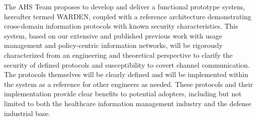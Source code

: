 \documentclass{sbir}
\begin{document}
 
 
\pagestyle{proprietary}


{The AHS Team proposes to develop and deliver a functional prototype system, hereafter termed WARDEN,  coupled with a reference architecture demonstrating cross-domain information protocols with known security characteristics. This system, based on our extensive and published previous work with usage management and policy-centric information networks,  will be rigorously characterized from an engineering and theoretical perspective to clarify the security of defined protocols and susceptibility to covert channel communication. The protocols themselves will be clearly defined and will be implemented within the system as a reference for other engineers as needed. These protocols and their implementation provide clear benefits to potential adopters, including but not limited to both the healthcare information management industry and the defense industrial base.}
\end{document}
